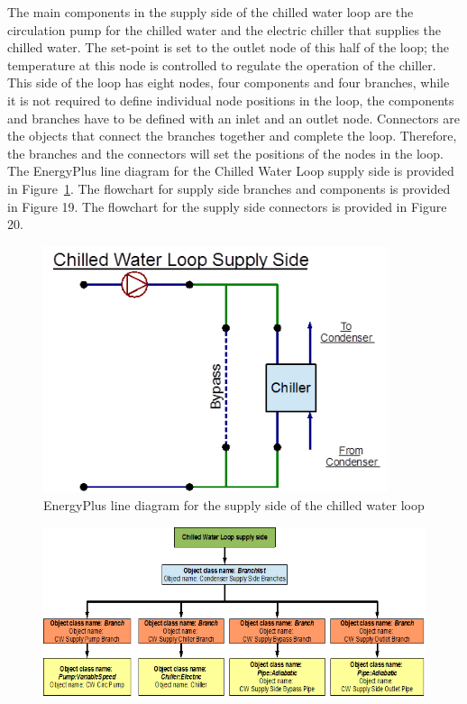 The main components in the supply side of the chilled water loop are the circulation pump for the chilled water and the electric chiller that supplies the chilled water. The set-point is set to the outlet node of this half of the loop; the temperature at this node is controlled to regulate the operation of the chiller. This side of the loop has eight nodes, four components and four branches, while it is not required to define individual node positions in the loop, the components and branches have to be defined with an inlet and an outlet node. Connectors are the objects that connect the branches together and complete the loop. Therefore, the branches and the connectors will set the positions of the nodes in the loop. The EnergyPlus line diagram for the Chilled Water Loop supply side is provided in Figure~\ref{fig:energyplus-line-diagram-for-the-supply-side}. The flowchart for supply side branches and components is provided in Figure 19. The flowchart for the supply side connectors is provided in Figure 20.

\begin{figure}[hbtp] %
\centering
\includegraphics[width=0.9\textwidth, height=0.9\textheight, keepaspectratio=true]{media/image018.png}
\caption{EnergyPlus line diagram for the supply side of the chilled water loop \protect \label{fig:energyplus-line-diagram-for-the-supply-side}}
\end{figure}

\begin{figure}[htbp]
\centering
\includegraphics{media/image019.png}
\caption{}
\end{figure}

